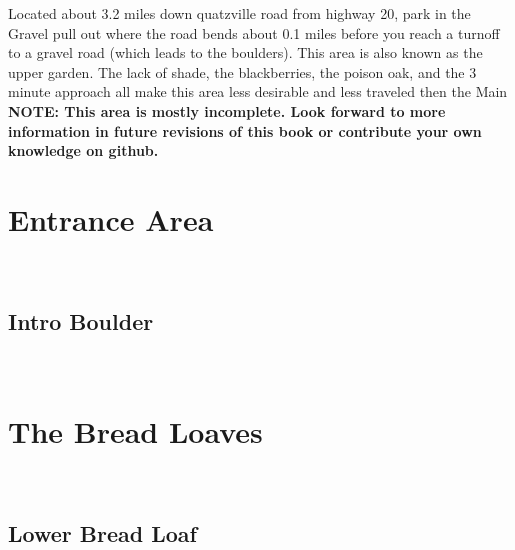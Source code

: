 \raggedcolumns
\begin{multicols}{2}
\begin{minipage}{\columnwidth}
Located about 3.2 miles down quatzville road from highway 20, park in the Gravel pull out where the road bends about 0.1 miles before you reach a turnoff to a gravel road (which leads to the boulders). This area is also known as the upper garden. The lack of shade, the blackberries, the poison oak, and the 3 minute approach all make this area less desirable and less traveled then the Main
\textbf{NOTE: This area is mostly incomplete. Look forward to more information in future revisions of this book or contribute your own knowledge on github.}
\end{minipage}

\newpage
		\section{Entrance Area}\label{sa:Entrance Area}
	\begin{minipage}{\columnwidth}
	\
	\end{minipage}
	
			\begin{minipage}{\columnwidth}
			\subsection*{Intro Boulder}\label{bf:Intro Boulder}
			\
			
			\end{minipage}
			
\newpage
		\section{The Bread Loaves}\label{sa:The Bread Loaves}
	\begin{minipage}{\columnwidth}
	\
	\end{minipage}
	
			\begin{minipage}{\columnwidth}
			\subsection*{Lower Bread Loaf}\label{bf:Lower Bread Loaf}
			\
			
			\end{minipage}
			

\end{multicols}
